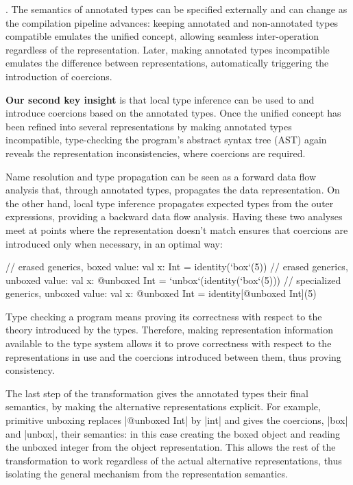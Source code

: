 . The semantics of annotated types can be specified externally and can change as the compilation pipeline advances: keeping annotated and non-annotated types compatible emulates the unified concept, allowing seamless inter-operation regardless of the representation. Later, making annotated types incompatible emulates the difference between representations, automatically triggering the introduction of coercions.

\textbf{Our second key insight} is that local type inference \cite{odersky-colored-local-type-inf, pierce-local-type-inference} can be used to  and  introduce coercions based on the annotated types. Once the unified concept has been refined into several representations by making annotated types incompatible, type-checking the program's abstract syntax tree (AST) again reveals the representation inconsistencies, where coercions are required.

 Name resolution and type propagation can be seen as a forward data flow analysis \cite{kildall-escape-analysis} that, through annotated types, propagates the data representation. On the other hand, local type inference \cite{odersky-colored-local-type-inf, pierce-local-type-inference} propagates expected types from the outer expressions, providing a backward data flow analysis. Having these two analyses meet at points where the representation doesn't match ensures that coercions are introduced only when necessary, in an optimal way:

\begin{lstlisting-nobreak}
 // erased generics, boxed value:
 val x: Int = identity(`box`(5))
 // erased generics, unboxed value:
 val x: @unboxed Int = `unbox`(identity(`box`(5)))
 // specialized generics, unboxed value:
 val x: @unboxed Int = identity[@unboxed Int](5)
\end{lstlisting-nobreak}

 Type checking a program means proving its correctness with respect to the theory introduced by the types. Therefore, making representation information available to the type system allows it to prove correctness with respect to the representations in use and the coercions introduced between them, thus proving consistency.

 The last step of the transformation gives the annotated types their final semantics, by making the alternative representations explicit. For example, primitive unboxing replaces |@unboxed Int| by |int| and gives the coercions, |box| and |unbox|, their semantics: in this case creating the boxed object and reading the unboxed integer from the object representation. This allows the rest of the transformation to work regardless of the actual alternative representations, thus isolating the general mechanism from the representation semantics.

